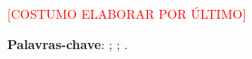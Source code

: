 \setlength{\absparsep}{18pt} %
\begin{resumo}
	\textcolor{red}{[COSTUMO ELABORAR POR ÚLTIMO]}

\textbf{Palavras-chave}: \firstkey ; \secondkey ; \thirdkey.
\end{resumo}
